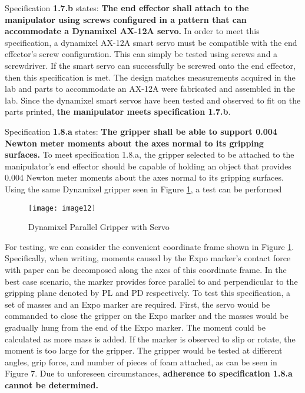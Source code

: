 Specification \textbf{1.7.b} states: \textbf{The end effector shall attach to the manipulator using screws configured in a pattern that can accommodate a Dynamixel AX-12A servo.} In order to meet this specification, a dynamixel AX-12A smart servo must be compatible with the end effector’s screw configuration. This can simply be tested using screws and a screwdriver. If the smart servo can successfully be screwed onto the end effector, then this specification is met. The design matches measurements acquired in the lab and parts to accommodate an AX-12A were fabricated and assembled in the lab. Since the dynamixel smart servos have been tested and observed to fit on the parts printed, \textbf{the manipulator meets specification 1.7.b}.


Specification \textbf{1.8.a} states: \textbf{The gripper shall be able to support 0.004 Newton meter moments about the axes normal to its gripping surfaces.} To meet specification 1.8.a, the gripper selected to be attached to the manipulator’s end effector should be capable of holding an object that provides 0.004 Newton meter moments about the axes normal to its gripping surfaces. Using the same Dynamixel gripper seen in Figure \ref{fig:gripper4}, a test can be performed

\begin{figure}[htp]
  \centering
  \texttt{[image: image12]}
  \caption{Dynamixel Parallel Gripper with Servo \cite{gripper1}}
  \label{fig:gripper4}
\end{figure}

For testing, we can consider the convenient coordinate frame shown in Figure \ref{fig:gripper4}. Specifically, when writing, moments caused by the Expo marker’s contact force with paper can be decomposed along the axes of this coordinate frame. In the best case scenario, the marker provides force parallel to and perpendicular to the gripping plane denoted by PL and PD respectively.
To test this specification, a set of masses and an Expo marker  are required. First, the servo would be commanded to close the gripper on the Expo marker and the masses would be gradually hung from the end of the Expo marker. The moment could be calculated as more mass is added. If the marker is observed to slip or rotate, the moment is too large for the gripper. The gripper would be tested at different angles, grip force, and number of pieces of foam attached, as can be seen in Figure 7. Due to unforeseen circumstances, \textbf{adherence to specification 1.8.a cannot be determined.}


